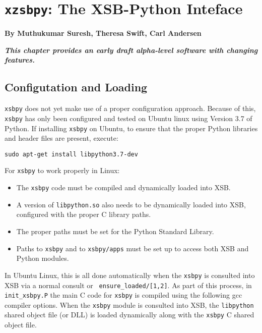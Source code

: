 
\chapter[XSB and Python]{{\tt xzsbpy}: The XSB-Python Inteface}

\begin{center}
  {\Large {\bf By Muthukumar Suresh, Theresa Swift, Carl Andersen}}
\end{center}

\noindent
{\large {\bf {\em This chapter provides an early draft alpha-level
      software with changing features.}}}

%
\section{Configutation and Loading}

{\tt xsbpy} does not yet make use of a proper configuration approach.
Because of this, {\tt xsbpy} has only been configured and tested on
Ubuntu linux using Version 3.7 of Python.  If installing {\tt xsbpy}
on Ubuntu, to ensure that the proper Python libraries and header files
are present, execute:

{\tt sudo apt-get install libpython3.7-dev}



For {\tt xsbpy} to work properly in Linux:
\begin{itemize}
\item The {\tt xsbpy} code must be compiled and dynamically loaded into XSB.
\item A version of {\tt libpython.so} also needs to be dynamically
  loaded into XSB, configured with the proper C library paths.
\item The proper paths must be set for the Python Standard Library.
\item Paths to {\tt xsbpy} and to {\tt xsbpy/apps} must be set up to
  access both XSB and Python modules.
\end{itemize}

In Ubuntu Linux, this is all done automatically when the {\tt xsbpy}
is consulted into XSB via a normal consult or {\tt
  ensure\_loaded/[1,2]}.  As part of this process, in {\tt
  init\_xsbpy.P} the main C code for {\tt xsbpy} is compiled using the
following gcc compiler options.  When the {\tt xsbpy} module is
consulted into XSB, the {\tt libpython} shared object file (or DLL) is
loaded dynamically along with the {\tt xsbpy} C shared object file.

